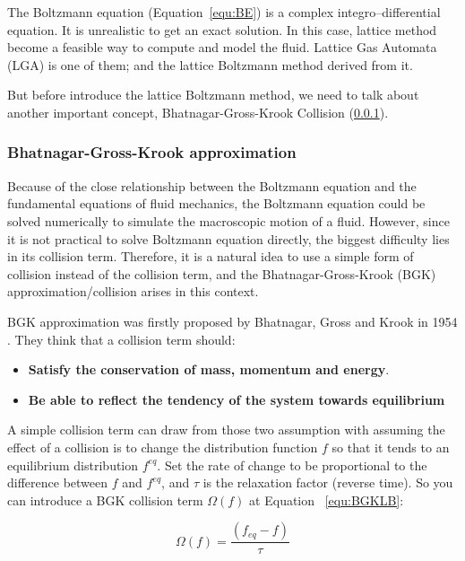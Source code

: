 The Boltzmann equation (Equation~\ref{equ:BE}) is a complex integro–differential equation. It is unrealistic to get an exact solution. In this case, lattice method become a feasible way to compute and model the fluid. Lattice Gas Automata (LGA) \cite{frisch1986lattice} is one of them; and the lattice Boltzmann method derived from it.

But before introduce the lattice Boltzmann method, we need to talk about another important concept, Bhatnagar-Gross-Krook Collision (\ref{sec:BKG}).

\subsubsection{Bhatnagar-Gross-Krook approximation} \label{sec:BKG}
Because of the close relationship between the Boltzmann equation and the fundamental equations of fluid mechanics, the Boltzmann equation could be solved numerically to simulate the macroscopic motion of a fluid. However, since it is not practical to solve Boltzmann equation directly, the biggest difficulty lies in its collision term\cite{chew1956boltzmann}. Therefore, it is a natural idea to use a simple form of collision instead of the collision term, and the Bhatnagar-Gross-Krook (BGK) approximation/collision \cite{bgk} arises in this context.

BGK approximation was firstly proposed by Bhatnagar, Gross and Krook in 1954 \cite{bgk}. They think that a collision term should: 

\begin{itemize}
\item \textbf{Satisfy the conservation of mass, momentum and energy}. 

\item \textbf{Be able to reflect the tendency of the system towards equilibrium}
\end{itemize}

A simple collision term can draw from those two assumption with assuming the effect of a collision is to change the distribution function $f$ so that it tends to an equilibrium distribution $f^{eq}$. Set the rate of change to be proportional to the difference between $f$ and $f^{eq}$, and $\tau$ is the relaxation factor (reverse time). So you can introduce a BGK collision term $\Omega (f)$ at Equation ~\ref{equ:BGKLB}:

\begin{equation}
\label{equ:BGKLB}
    \Omega (f) = \frac{(f_{eq} - f)}{\tau}
\end{equation}

